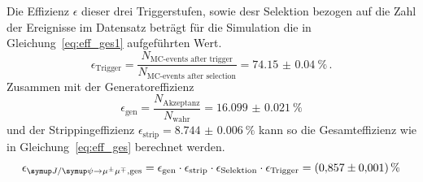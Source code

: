 %
Die Effizienz $\epsilon$ dieser drei Triggerstufen, sowie desr Selektion bezogen auf die Zahl der Ereignisse im Datensatz beträgt für die Simulation die in Gleichung~\eqref{eq:eff_ges1} aufgeführten Wert.
%
\begin{equation}
  \epsilon_\text{Trigger}=\frac{N_\text{MC-events after trigger}}{N_\text{MC-events after selection}}=\SI{74.15(4)}{\percent} \, .%
  \label{eq:eff_ges1}
\end{equation}
%
Zusammen mit der Generatoreffizienz
%
\begin{equation}
  \epsilon_\text{gen}=\frac{N_\text{Akzeptanz}}{N_\text{wahr}}=\SI{16.099(21)}{\percent}
\end{equation}
%
und der Strippingeffizienz $\epsilon_\text{strip}=\SI{8.744(6)}{\percent}$ kann so die Gesamteffizienz wie in Gleichung~\eqref{eq:eff_ges} berechnet werden.
%
\begin{equation}
  \epsilon_{\kontroll, \text{ges}}
  =\epsilon_\text{gen}\cdot\epsilon_\text{strip}\cdot\epsilon_\text{Selektion}\cdot\epsilon_\text{Trigger}=\SI{0.857(1)}{\percent}
  \label{eq:eff_ges}
\end{equation}
